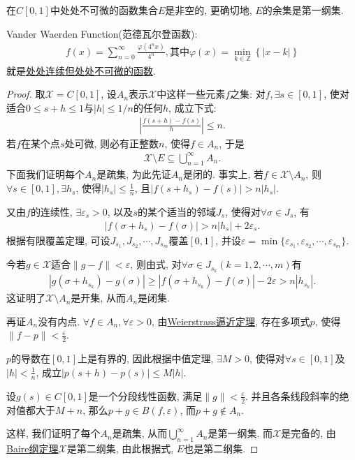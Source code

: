 \documentclass[../../main.tex]{subfiles}%
\begin{document}
\begin{theorem}
在$C[0,1]$中处处不可微的函数集合$E$是非空的, 更确切地, $E$的余集是第一纲集.
\end{theorem}
\begin{remark}
Vander Waerden Function(范德瓦尔登函数):
\begin{align*}
f\left( x \right) =\sum_{n=0}^{\infty}{\frac{\varphi \left( 4^nx \right)}{4^n}},\text{其中}\varphi \left( x \right) =\underset{k\in \mathbb{Z}}{\min}\left\{ \left| x-k \right| \right\}
\end{align*}
就是\href{https://mp.weixin.qq.com/s/ki-x99Me_kKvQUvfXS-GGQ}{处处连续但处处不可微的函数}.
\end{remark}
\begin{proof}
取$\mathscr{X}=C[0,1]$, 设$A_n$表示$\mathscr{X}$中这样一些元素$f$之集: 对$f,\exists s\in[0,1]$, 使对适合$0\leqslant s+h\leqslant1$与$|h|\leqslant1/n$的任何$h$, 成立下式:
\begin{align*}
\left|\frac{f(s+h)-f(s)}{h}\right|\leqslant n.
\end{align*}
若$f$在某个点$s$处可微, 则必有正整数$n$, 使得$f\in A_n$, 于是
\begin{align}
\mathscr{X}\setminus E\subseteq\bigcup\limits_{n=1}^{\infty}A_n.
\end{align}
下面我们证明每个$A_n$是疏集, 为此先证$A_n$是闭的. 事实上, 若$f\in\mathscr{X}\setminus A_n$, 则$\forall s\in[0,1],\exists h_s$, 使得$|h_s|\leqslant\frac{1}{n}$, 且$|f(s+h_s)-f(s)|>n|h_s|$.

又由$f$的连续性, $\exists\varepsilon_s>0$, 以及$s$的某个适当的邻域$J_s$, 使得对$\forall\sigma\in J_s$, 有
\begin{align}
|f(\sigma+h_s)-f(\sigma)|>n|h_s|+2\varepsilon_s.
\end{align}
根据有限覆盖定理, 可设$J_{s_1},J_{s_2},\cdots,J_{s_m}$覆盖$[0,1]$, 并设$\varepsilon=\min\{\varepsilon_{s_1},\varepsilon_{s_2},\cdots,\varepsilon_{s_m}\}$.

今若$g\in\mathscr{X}$适合$\|g-f\|<\varepsilon$, 则由式, 对$\forall\sigma\in J_{s_k}(k=1,2,\cdots,m)$有
\begin{align*}
|g(\sigma+h_{s_k})-g(\sigma)|\geqslant|f(\sigma+h_{s_k})-f(\sigma)|-2\varepsilon>n|h_{s_k}|.
\end{align*}
这证明了$\mathscr{X}\setminus A_n$是开集, 从而$A_n$是闭集.

再证$A_n$没有内点. $\forall f\in A_n,\forall\varepsilon>0$, 由\hyperref[Basis of Analytics-theorem:多项式逼近有限阶光滑函数-Weierstrass逼近定理]{Weierstrass逼近定理}, 存在多项式$p$, 使得$\|f-p\|<\frac{\varepsilon}{2}$.

$p$的导数在$[0,1]$上是有界的, 因此根据中值定理, $\exists M>0$, 使得对$\forall s\in[0,1]$及$|h|<\frac{1}{n}$, 成立$|p(s+h)-p(s)|\leqslant M|h|$.

设$g(s)\in C[0,1]$是一个分段线性函数, 满足$\|g\|<\frac{\varepsilon}{2}$. 并且各条线段斜率的绝对值都大于$M+n$, 那么$p+g\in B(f,\varepsilon)$, 而$p+g\notin A_n$.

这样, 我们证明了每个$A_n$是疏集, 从而$\bigcup\limits_{n=1}^{\infty}A_n$是第一纲集. 而$\mathscr{X}$是完备的, 由\hyperref[theorem:泛函分析--Baire纲定理]{Baire纲定理}$\mathscr{X}$是第二纲集, 由此根据式, $E$也是第二纲集.
\end{proof}
\end{document}
